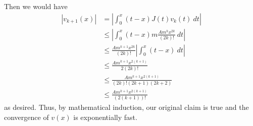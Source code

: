 \documentclass{article}
\begin{document}
Then we would have
\begin{equation*}
    \begin{aligned}
        |v_{k+1}(x)|&=|\int_{0}^{x} (t-x)J(t)v_{k}(t)\ dt| \\
        &\leq |\int_{0}^{x}(t-x)m\frac{Am^k x^{2k}}{(2k)!}\ dt| \\
        &\leq \frac{Am^{k+1} x^{2k}}{(2k)!}|\int_{0}^{x}(t-x)\ dt| \\
        &\leq \frac{Am^{k+1} x^{2(k+1)}}{2(2k)!} \\
        &\leq \frac{Am^{k+1} x^{2(k+1)}}{(2k)!(2k+1)(2k+2)} \\
        &\leq \frac{Am^{k+1} x^{2(k+1)}}{(2(k+1))!}
    \end{aligned}
\end{equation*}
as desired. Thus, by mathematical induction, our original claim is true and the convergence of $v(x)$ is exponentially fast.

\hrulefill
\end{document}
